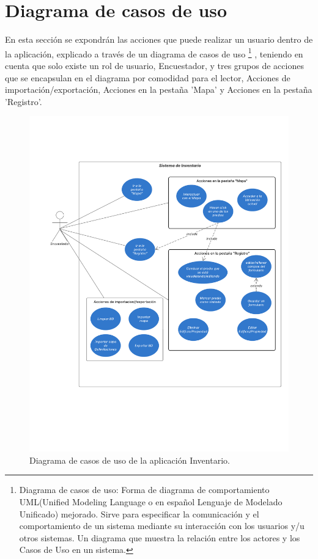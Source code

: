 \section{Diagrama de casos de uso}\label{section:casosDeUso}
En esta sección se expondrán las acciones que puede realizar un usuario dentro de la aplicación, explicado a través de un diagrama de casos de uso
\footnote{Diagrama de casos de uso: Forma de diagrama de comportamiento UML(Unified Modeling Language o en español Lenguaje de Modelado Unificado) mejorado. Sirve para
    especificar la comunicación y el comportamiento de un sistema mediante su interacción con los usuarios
    y/u otros sistemas. Un diagrama que muestra la relación entre los actores y los Casos de Uso en un
    sistema.}
, teniendo en cuenta que solo existe un rol de usuario, Encuestador,
y tres grupos de acciones que se encapsulan en el diagrama por comodidad para el lector, Acciones de importación/exportación, Acciones en la pestaña 'Mapa' y Acciones en
la pestaña 'Registro'.
\pagebreak
\begin{figure}[h]
    \centering
    \includegraphics[scale=0.5]{Graphics/Capitulo 3/Diagrama_casos_de_uso.png}
    \caption{Diagrama de casos de uso de la aplicación Inventario.} %
    \label{fig:figura13}
\end{figure}
